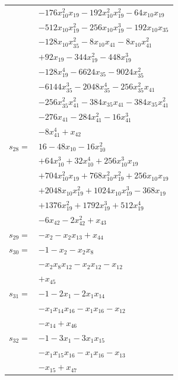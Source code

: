 \begin{longtable}{@{}r@{\;}l@{}}
 & \(\displaystyle -176x_{10}^{2}x_{19} -192x_{10}^{2}x_{19}^{2} -64x_{10}x_{19}\) \\
 & \(\displaystyle -512x_{10}x_{19}^{2} -256x_{10}x_{19}^{3} -192x_{10}x_{35}\) \\
 & \(\displaystyle -128x_{10}x_{35}^{2} -8x_{10}x_{41} -8x_{10}x_{41}^{2}\) \\
 & \(\displaystyle +92x_{19} -344x_{19}^{2} -448x_{19}^{3}\) \\
 & \(\displaystyle -128x_{19}^{4} -6624x_{35} -9024x_{35}^{2}\) \\
 & \(\displaystyle -6144x_{35}^{3} -2048x_{35}^{4} -256x_{35}^{2}x_{41}\) \\
 & \(\displaystyle -256x_{35}^{2}x_{41}^{2} -384x_{35}x_{41} -384x_{35}x_{41}^{2}\) \\
 & \(\displaystyle -276x_{41} -284x_{41}^{2} -16x_{41}^{3}\) \\
 & \(\displaystyle -8x_{41}^{4} +x_{42}\) \\[3pt]
\(s_{28}=\) & \(\displaystyle 16 -48x_{10} -16x_{10}^{2}\) \\
 & \(\displaystyle +64x_{10}^{3} +32x_{10}^{4} +256x_{10}^{3}x_{19}\) \\
 & \(\displaystyle +704x_{10}^{2}x_{19} +768x_{10}^{2}x_{19}^{2} +256x_{10}x_{19}\) \\
 & \(\displaystyle +2048x_{10}x_{19}^{2} +1024x_{10}x_{19}^{3} -368x_{19}\) \\
 & \(\displaystyle +1376x_{19}^{2} +1792x_{19}^{3} +512x_{19}^{4}\) \\
 & \(\displaystyle -6x_{42} -2x_{42}^{2} +x_{43}\) \\[3pt]
\(s_{29}=\) & \(\displaystyle -x_{2} -x_{2}x_{13} +x_{44}\) \\[3pt]
\(s_{30}=\) & \(\displaystyle -1 -x_{2} -x_{2}x_{8}\) \\
 & \(\displaystyle -x_{2}x_{8}x_{12} -x_{2}x_{12} -x_{12}\) \\
 & \(\displaystyle +x_{45}\) \\[3pt]
\(s_{31}=\) & \(\displaystyle -1 -2x_{1} -2x_{1}x_{14}\) \\
 & \(\displaystyle -x_{1}x_{14}x_{16} -x_{1}x_{16} -x_{12}\) \\
 & \(\displaystyle -x_{14} +x_{46}\) \\[3pt]
\(s_{32}=\) & \(\displaystyle -1 -3x_{1} -3x_{1}x_{15}\) \\
 & \(\displaystyle -x_{1}x_{15}x_{16} -x_{1}x_{16} -x_{13}\) \\
 & \(\displaystyle -x_{15} +x_{47}\) \\[3pt]

\end{longtable}
